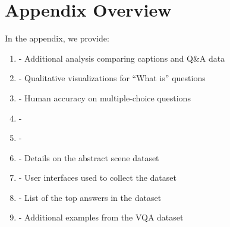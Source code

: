 \section*{Appendix Overview}
In the appendix, we provide:
 \begin{enumerate}[I]
\setlength{\itemsep}{1pt}
  \setlength{\parskip}{0pt}
  \setlength{\parsep}{0pt}
 \item - Additional analysis comparing captions and Q\&A data
 \item - Qualitative visualizations for ``What is'' questions
 \item - Human accuracy on multiple-choice questions
 \item - 
  \item - 
 \item - Details on the abstract scene dataset
 \item - User interfaces used to collect the dataset
 \item - List of the top answers in the dataset
 \item - Additional examples from the VQA dataset
 \end{enumerate}

%
